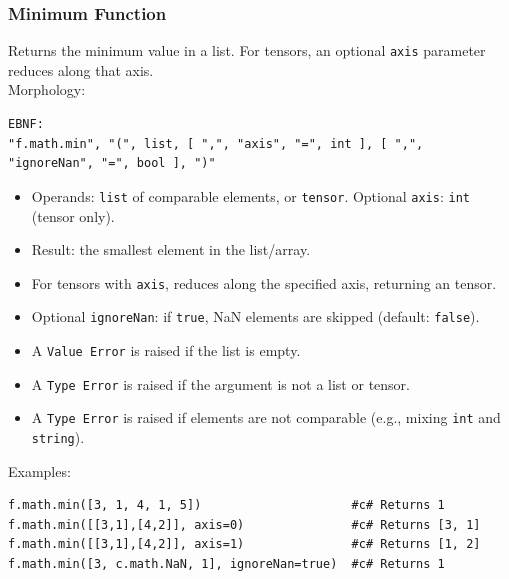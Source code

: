 \subsubsection{Minimum Function}
Returns the minimum value in a list. For tensors, an optional \texttt{axis} parameter reduces along that axis. \\
Morphology:
\begin{verbatim}
EBNF:
"f.math.min", "(", list, [ ",", "axis", "=", int ], [ ",", "ignoreNan", "=", bool ], ")"
\end{verbatim}
\begin{itemize}
\item Operands: \texttt{list} of comparable elements, or \texttt{tensor}. Optional \texttt{axis}: \texttt{int} (tensor only).
\item Result: the smallest element in the list/array.
\item For tensors with \texttt{axis}, reduces along the specified axis, returning an tensor.
\item Optional \texttt{ignoreNan}: if \texttt{true}, NaN elements are skipped (default: \texttt{false}).
\item A \texttt{Value Error} is raised if the list is empty.
\item A \texttt{Type Error} is raised if the argument is not a list or tensor.
\item A \texttt{Type Error} is raised if elements are not comparable (e.g., mixing \texttt{int} and \texttt{string}).
\end{itemize}
Examples:
\begin{verbatim}
f.math.min([3, 1, 4, 1, 5])                     #c# Returns 1
f.math.min([[3,1],[4,2]], axis=0)               #c# Returns [3, 1]
f.math.min([[3,1],[4,2]], axis=1)               #c# Returns [1, 2]
f.math.min([3, c.math.NaN, 1], ignoreNan=true)  #c# Returns 1
\end{verbatim}

